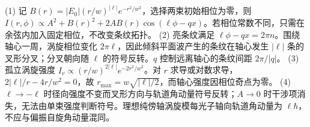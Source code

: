 (1) 记 \(B(r)=|E_0|(r/w)^{|\ell|}e^{-r^2/w^2}\)，选择两束初始相位为零，则 \(I(r,\phi)\propto A^2+B(r)^2+2AB(r)\cos(\ell\phi-qx)\)。若相位常数不同，只需在余弦内加入固定相位，不改变条纹拓扑。
(2) 亮条纹满足 \(\ell\phi-qx=2\pi n\)。围绕轴心一周，涡旋相位变化 \(2\pi\ell\)，因此倾斜平面波产生的条纹在轴心发生 \(|\ell|\) 条的叉形分叉；分叉朝向随 \(\ell\) 的符号反转。\(q\) 控制远离轴心的条纹间距 \(2\pi/|q|\)。
(3) 孤立涡旋强度 \(I_v\propto(r/w)^{2|\ell|}e^{-2r^2/w^2}\)。对 \(r\) 求导或对数求导，\(2|\ell|/r-4r/w^2=0\)，故 \(r_{\max}=w\sqrt{|\ell|/2}\)，而轴心强度因相位奇点为零。
(4) \(\ell\to-\ell\) 时径向强度不变而叉形方向与轨道角动量符号反转；\(A\to0\) 时干涉项消失，无法由单束强度判断符号。理想纯傍轴涡旋模每光子轴向轨道角动量为 \(\ell\hbar\)，不应与偏振自旋角动量混同。
